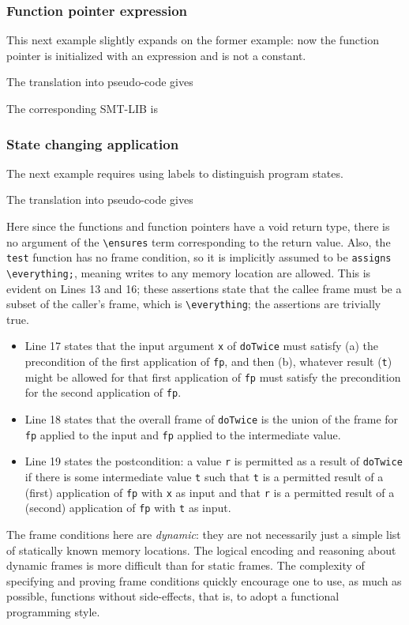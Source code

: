 \subsubsection{Function pointer expression}

This next example slightly expands on the former example: now the function pointer is initialized with an expression and is not a constant.


The translation into pseudo-code gives


The corresponding SMT-LIB is


\subsubsection{State changing application}
The next example requires using labels to distinguish program states.


The translation into pseudo-code gives


Here since the functions and function pointers have a void return type, there is no argument of the \lstinline|\ensures| term corresponding to the return value. Also, the \lstinline|test| function has no frame condition, 
so it is implicitly assumed to be \lstinline|assigns \everything;|, meaning writes to any memory location are allowed. This is evident on
Lines 13 and 16; these assertions state that the callee frame must be 
a subset of the caller's frame, which is \lstinline|\everything|;
the assertions are trivially true. 
\begin{itemize}
	\item Line 17 states that the input argument \lstinline|x| of \lstinline|doTwice|
	must satisfy (a) the precondition of the first application of
	\lstinline|fp|, and then (b), whatever result (\lstinline|t|) might be allowed
	for that first application of \lstinline|fp| must satisfy the
	precondition for the second application of \lstinline|fp|.
	\item Line 18 states that the overall frame of \lstinline|doTwice| is
	the union of the frame for \lstinline|fp| applied to the input and
	\lstinline|fp| applied to the intermediate value.
	\item Line 19 states the postcondition: a value \lstinline|r| is 
	permitted as a result of \lstinline|doTwice| if there is some
	intermediate value \lstinline|t| such that \lstinline|t| is a permitted result of a (first) application of \lstinline|fp| with \lstinline|x| as input and that \lstinline|r| is a permitted result
	of a (second) application of \lstinline|fp| with \lstinline|t| as input.
\end{itemize}
The frame conditions here are \emph{dynamic}: they are not 
necessarily just a simple list of statically known memory locations. The logical encoding and
reasoning about dynamic frames is more difficult than for static frames.
The complexity of specifying and proving frame conditions quickly encourage one to use, as much as possible, functions without side-effects,
that is, to adopt a functional programming style.


